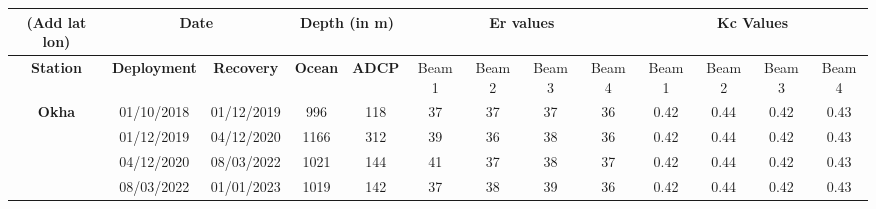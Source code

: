 \begin{table}[]
\begin{tabular}{|c|cc|cc|cccc|cccc|}
\hline
\textbf{(Add lat lon)}                & \multicolumn{2}{c|}{\textbf{Date}}                           & \multicolumn{2}{c|}{\textbf{Depth (in m)}}          & \multicolumn{4}{c|}{\textbf{Er values}}                                                          & \multicolumn{4}{c|}{\textbf{Kc Values}}                                                          \\ \hline
\textbf{Station}                      & \multicolumn{1}{c|}{\textbf{Deployment}} & \textbf{Recovery} & \multicolumn{1}{c|}{\textbf{Ocean}} & \textbf{ADCP} & \multicolumn{1}{c|}{Beam 1} & \multicolumn{1}{c|}{Beam 2} & \multicolumn{1}{c|}{Beam 3} & Beam 4 & \multicolumn{1}{c|}{Beam 1} & \multicolumn{1}{c|}{Beam 2} & \multicolumn{1}{c|}{Beam 3} & Beam 4 \\ \hline
\multirow{4}{*}{\textbf{Okha}}        & \multicolumn{1}{c|}{01/10/2018}          & 01/12/2019        & \multicolumn{1}{c|}{996}            & 118           & \multicolumn{1}{c|}{37}     & \multicolumn{1}{c|}{37}     & \multicolumn{1}{c|}{37}     & 36     & \multicolumn{1}{c|}{0.42}   & \multicolumn{1}{c|}{0.44}   & \multicolumn{1}{c|}{0.42}   & 0.43   \\ \cline{2-13} 
                                      & \multicolumn{1}{c|}{01/12/2019}          & 04/12/2020        & \multicolumn{1}{c|}{1166}           & 312           & \multicolumn{1}{c|}{39}     & \multicolumn{1}{c|}{36}     & \multicolumn{1}{c|}{38}     & 36     & \multicolumn{1}{c|}{0.42}   & \multicolumn{1}{c|}{0.44}   & \multicolumn{1}{c|}{0.42}   & 0.43   \\ \cline{2-13} 
                                      & \multicolumn{1}{c|}{04/12/2020}          & 08/03/2022        & \multicolumn{1}{c|}{1021}           & 144           & \multicolumn{1}{c|}{41}     & \multicolumn{1}{c|}{37}     & \multicolumn{1}{c|}{38}     & 37     & \multicolumn{1}{c|}{0.42}   & \multicolumn{1}{c|}{0.44}   & \multicolumn{1}{c|}{0.42}   & 0.43   \\ \cline{2-13} 
                                      & \multicolumn{1}{c|}{08/03/2022}          & 01/01/2023        & \multicolumn{1}{c|}{1019}           & 142           & \multicolumn{1}{c|}{37}     & \multicolumn{1}{c|}{38}     & \multicolumn{1}{c|}{39}     & 36     & \multicolumn{1}{c|}{0.42}   & \multicolumn{1}{c|}{0.44}   & \multicolumn{1}{c|}{0.42}   & 0.43   \\ \hline

\end{tabular}
\end{table}

